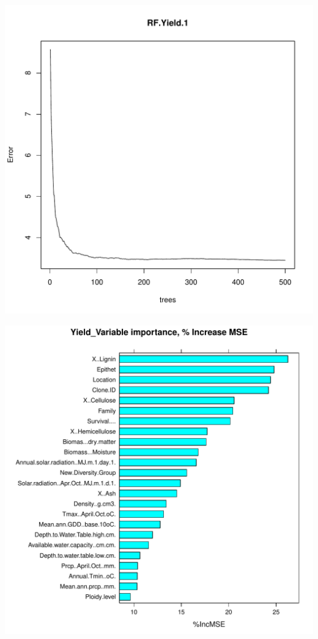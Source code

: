 \documentclass{article}\usepackage[]{graphicx}\usepackage[]{color}
\makeatletter
\def\maxwidth{ %
  \ifdim\Gin@nat@width>\linewidth
    \linewidth
  \else
    \Gin@nat@width
  \fi
}
\newenvironment{knitrout}{}{} %
\makeatother
\begin{document}
\begin{knitrout}
\color{fgcolor}

{\centering \includegraphics[width=\maxwidth]{figure/VariableSelectionApproach-1} 

}




{\centering \includegraphics[width=\maxwidth]{figure/VariableSelectionApproach-2} 

}
\end{knitrout}
\end{document}
